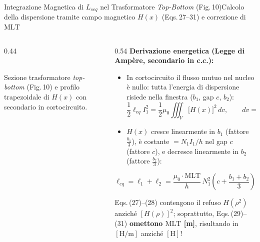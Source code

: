 \documentclass[aspectratio=169,9pt]{beamer}
\begin{document}
\begin{frame}{Integrazione Magnetica di $L_{seq}$ nel Trasformatore \emph{Top-Bottom} (Fig.\,10)}{Calcolo della dispersione tramite campo magnetico $H(x)$ (Eqs.\,27--31) e correzione di $\mathrm{MLT}$}
\begin{columns}[T,onlytextwidth]
\begin{column}{0.44\textwidth}
      \\[1mm]
      {\tiny\color{MutedGray}Sezione trasformatore \emph{top-bottom} (Fig.\,10) e profilo trapezoidale di $H(x)$ con secondario in cortocircuito.}
    \end{column}
    \begin{column}{0.54\textwidth}
      \scriptsize
      \textbf{\color{PrimaryBlue}Derivazione energetica (Legge di Amp\`ere, secondario in c.c.):}
      \begin{itemize}\setlength{\itemsep}{1.8pt}
        \item In cortocircuito il flusso mutuo nel nucleo \`e nullo: tutta l'energia di dispersione risiede nella finestra ($b_1$, gap $c$, $b_2$):
          \[
            \frac{1}{2}\ell_{eq} I_1^2 = \frac{1}{2}\mu_0 \!\iiint_V \bigl[H(x)\bigr]^2\,dv, \qquad dv = \mathrm{MLT}\cdot h \cdot dx
          \]
        \item $H(x)$ cresce linearmente in $b_1$ (fattore $\frac{b_1}{3}$), \`e costante $=N_1 I_1/h$ nel gap $c$ (fattore $c$), e decresce linearmente in $b_2$ (fattore $\frac{b_2}{3}$):
      \end{itemize}
      \begin{okbox}[title={Eqs.\,(29)--(31) Corrette (con Lunghezza Media di Spira $\mathrm{MLT}$)}]
        \[
          \ell_{eq} = \ell_1 + \ell_2 = \frac{\mu_0 \cdot \mathbf{\mathrm{MLT}}}{h}\,N_1^2\!\left(c + \frac{b_1 + b_2}{3}\right) \;\; [\text{H}]
        \]
      \end{okbox}
      \vspace*{1mm}
      \begin{warnbox}[title={Audit su Eqs.\,(27)--(31) del Paper}]
        Eqs.\,(27)--(28) contengono il refuso $H(\rho^2)$ anzich\'e $[H(\rho)]^2$; soprattutto, Eqs.\,(29)--(31) \textbf{omettono $\mathrm{MLT}$ [m]}, risultando in $[\text{H/m}]$ anzich\'e $[\text{H}]$!
      \end{warnbox}
      \vspace*{1mm}

\end{column}
\end{columns}
\end{frame}
\end{document}
